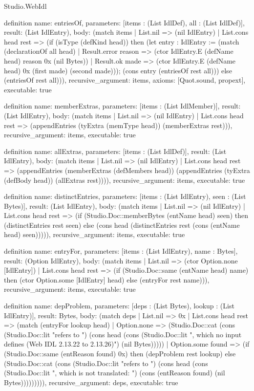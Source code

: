 \begin{lexlean}{Studio.WebIdl}
\begin{semanticmodule}
{{definition{
  name: entriesOf,
  parameters: [items : (List IdlDef), all : (List IdlDef)],
  result: (List IdlEntry),
  body: (match items
    | List.nil => (nil IdlEntry)
    | List.cons head rest => (if (isType (defKind head)) then (let entry : IdlEntry := (match (declarationOf all head)
    | Result.error reason => (ctor IdlEntry.E (defName head) reason 0x (nil Bytes))
    | Result.ok made => (ctor IdlEntry.E (defName head) 0x (first made) (second made))); (cons entry (entriesOf rest all))) else (entriesOf rest all))),
  recursive_argument: items,
  axioms: [Quot.sound, propext],
  executable: true
}

definition{
  name: memberExtras,
  parameters: [items : (List IdlMember)],
  result: (List IdlEntry),
  body: (match items
    | List.nil => (nil IdlEntry)
    | List.cons head rest => (appendEntries (tyExtra (memType head)) (memberExtras rest))),
  recursive_argument: items,
  executable: true
}

definition{
  name: allExtras,
  parameters: [items : (List IdlDef)],
  result: (List IdlEntry),
  body: (match items
    | List.nil => (nil IdlEntry)
    | List.cons head rest => (appendEntries (memberExtras (defMembers head)) (appendEntries (tyExtra (defBody head)) (allExtras rest)))),
  recursive_argument: items,
  executable: true
}

definition{
  name: distinctEntries,
  parameters: [items : (List IdlEntry), seen : (List Bytes)],
  result: (List IdlEntry),
  body: (match items
    | List.nil => (nil IdlEntry)
    | List.cons head rest => (if (Studio.Doc::memberBytes (entName head) seen) then (distinctEntries rest seen) else (cons head (distinctEntries rest (cons (entName head) seen))))),
  recursive_argument: items,
  executable: true
}

definition{
  name: entryFor,
  parameters: [items : (List IdlEntry), name : Bytes],
  result: (Option IdlEntry),
  body: (match items
    | List.nil => (ctor Option.none [IdlEntry])
    | List.cons head rest => (if (Studio.Doc::same (entName head) name) then (ctor Option.some [IdlEntry] head) else (entryFor rest name))),
  recursive_argument: items,
  executable: true
}

definition{
  name: depProblem,
  parameters: [deps : (List Bytes), lookup : (List IdlEntry)],
  result: Bytes,
  body: (match deps
    | List.nil => 0x
    | List.cons head rest => (match (entryFor lookup head)
    | Option.none => (Studio.Doc::cat (cons (Studio.Doc::lit "refers to ") (cons head (cons (Studio.Doc::lit ", which no input defines (Web IDL 2.13.22 to 2.13.26)") (nil Bytes)))))
    | Option.some found => (if (Studio.Doc::same (entReason found) 0x) then (depProblem rest lookup) else (Studio.Doc::cat (cons (Studio.Doc::lit "refers to ") (cons head (cons (Studio.Doc::lit ", which is not translated: ") (cons (entReason found) (nil Bytes))))))))),
  recursive_argument: deps,
  executable: true
}

}}
\end{semanticmodule}
\end{lexlean}
